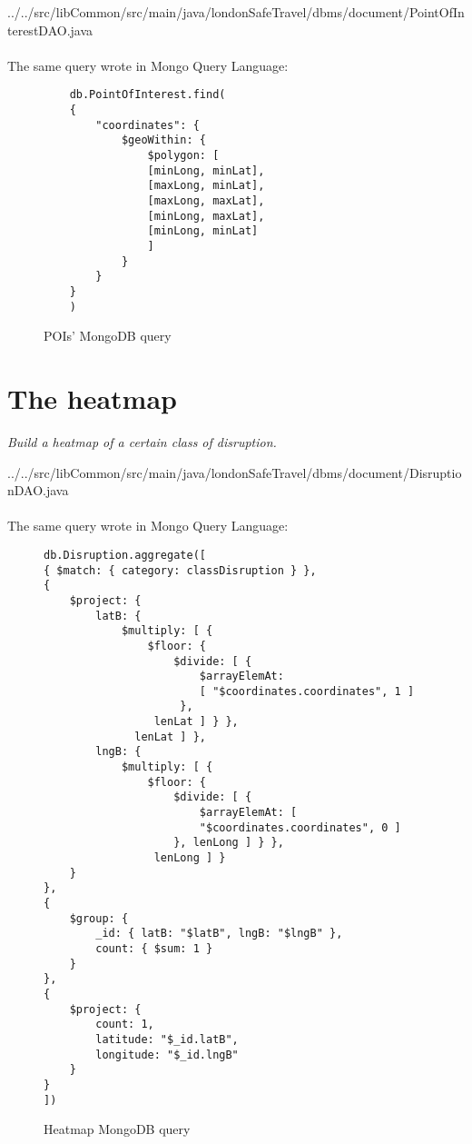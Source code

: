 
{../../src/libCommon/src/main/java/londonSafeTravel/dbms/document/PointOfInterestDAO.java}

\paragraph{}
The same query wrote in Mongo Query Language:
\begin{figure}[H]
\begin{lstlisting}
	db.PointOfInterest.find(
	{
		"coordinates": {
			$geoWithin: {
				$polygon: [
				[minLong, minLat],
				[maxLong, minLat],
				[maxLong, maxLat],
				[minLong, maxLat],
				[minLong, minLat]
				]
			}
		}
	}
	)
\end{lstlisting}
\caption{POIs' MongoDB query}
\end{figure}

\section{The heatmap}
\textit{Build a heatmap of a certain class of disruption.}


{../../src/libCommon/src/main/java/londonSafeTravel/dbms/document/DisruptionDAO.java}

\paragraph{}
The same query wrote in Mongo Query Language:
\begin{figure}[H]
	\begin{lstlisting}
db.Disruption.aggregate([
{ $match: { category: classDisruption } },
{ 
	$project: {
		latB: { 
			$multiply: [ { 
				$floor: { 
					$divide: [ { 
						$arrayElemAt: 
						[ "$coordinates.coordinates", 1 ]
					 }, 
				 lenLat ] } },
			  lenLat ] },
		lngB: { 
			$multiply: [ { 
				$floor: { 
					$divide: [ { 
						$arrayElemAt: [ 
						"$coordinates.coordinates", 0 ] 
					}, lenLong ] } },
				 lenLong ] }
	}
},
{ 
	$group: {
		_id: { latB: "$latB", lngB: "$lngB" },
		count: { $sum: 1 }
	}
},
{
	$project: {
		count: 1,
		latitude: "$_id.latB",
		longitude: "$_id.lngB"
	}
}
])
\end{lstlisting}
\caption{Heatmap MongoDB query}
\end{figure}

